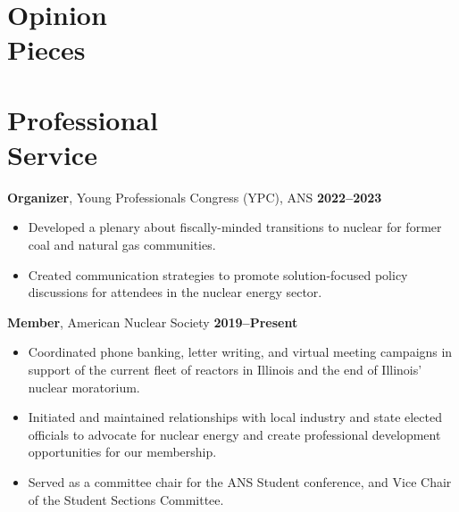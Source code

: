 \documentclass[margin,line]{resume}
\begin{document}
\begin{resume}
    \section{\mysidestyle Opinion\\Pieces}
    \begin{bibenum}
         \item {}
    \end{bibenum}

    \section{\mysidestyle Professional\\Service}

    \textbf{Organizer}, Young Professionals Congress (YPC), ANS \hfill \textbf{2022--2023}\vspace{.5mm}\\%
    \begin{itemize}
        \item Developed a plenary about fiscally-minded transitions to nuclear for former coal and natural gas communities.
        \item Created communication strategies to promote solution-focused policy discussions for attendees in the nuclear energy sector.
    \end{itemize}

    \textbf{Member}, American Nuclear Society  \hfill \textbf{2019--Present}\vspace{.5mm}\\%
    \begin{itemize}
        \item Coordinated phone banking, letter writing, and virtual meeting campaigns in support of the current fleet of reactors in Illinois and the end of Illinois' nuclear moratorium.
        \item Initiated and maintained relationships with local industry and state elected officials to advocate for nuclear energy and create professional development opportunities for our membership.
        \item Served as a committee chair for the ANS Student conference, and Vice Chair of the Student Sections Committee.
    \end{itemize}

\end{resume}
\end{document}
